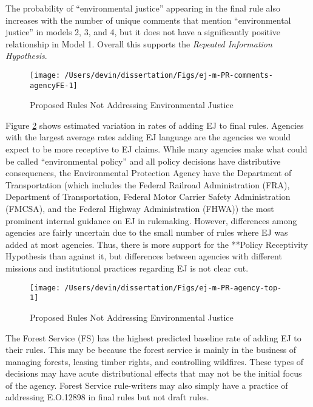 \documentclass[
      12pt,
        ]{article}
\begin{document}
The probability of
``environmental justice'' appearing in the final rule also increases with the number of unique comments that mention ``environmental justice'' in models 2, 3, and 4, but it does not have a significantly positive relationship in Model 1. Overall this supports the \emph{Repeated Information Hypothesis}.

\begin{figure}

{\centering \texttt{[image: /Users/devin/dissertation/Figs/ej-m-PR-comments-agencyFE-1]} 

}

\caption{Proposed Rules Not Addressing Environmental Justice}\label{fig:ej-m-PR-comments-agencyFE}
\end{figure}

Figure \ref{fig:ej-m-PR-agency-top} shows estimated variation in rates of adding EJ to final rules.
Agencies with the largest average rates adding EJ language are the agencies we would expect to be more receptive to EJ claims. While many agencies make what could be called ``environmental policy'' and all policy decisions have distributive consequences, the Environmental Protection Agency have the Department of Transportation (which includes the Federal Railroad Administration (FRA), Department of Transportation, Federal Motor Carrier Safety Administration (FMCSA), and the Federal Highway Administration (FHWA)) the most prominent internal guidance on EJ in rulemaking. However, differences among agencies are fairly uncertain due to the small number of rules where EJ was added at most agencies. Thus, there is more support for the **Policy Receptivity Hypothesis than against it, but differences between agencies with different missions and institutional practices regarding EJ is not clear cut.

\begin{figure}

{\centering \texttt{[image: /Users/devin/dissertation/Figs/ej-m-PR-agency-top-1]} 

}

\caption{Proposed Rules Not Addressing Environmental Justice}\label{fig:ej-m-PR-agency-top}
\end{figure}

The Forest Service (FS) has the highest predicted baseline rate of adding EJ to their rules. This may be because the forest service is mainly in
the business of managing forests, leasing timber rights, and controlling
wildfires. These types of decisions may have acute distributional
effects that may not be the initial focus of the agency. Forest Service rule-writers may also simply have a practice of addressing E.O.12898 in final rules but not draft rules.
\end{document}
